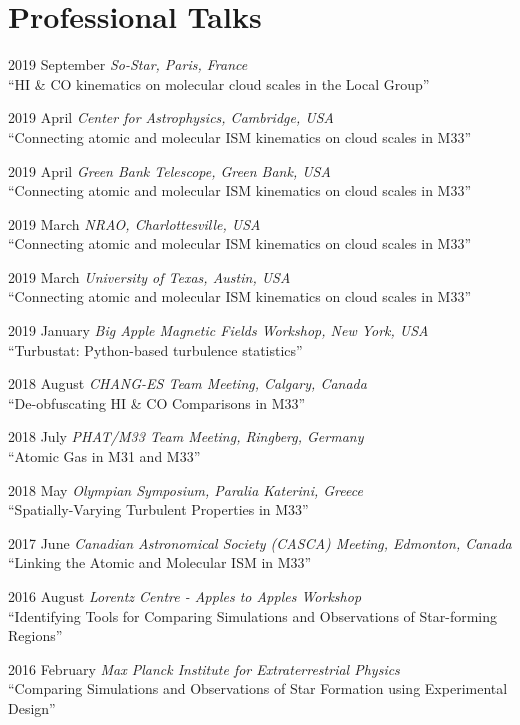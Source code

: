 \documentclass[letterpaper,11pt]{article}
\newlength{\mainindent} \setlength{\mainindent}{12pt}
\newlength{\contentindent} \setlength{\contentindent}{19ex}
\newenvironment{datelist}{
  \begingroup
  \raggedright
  \begin{description}[labelindent=\mainindent,leftmargin=\contentindent,
      style=sameline,font=\normalfont,topsep=0pt,partopsep=0pt,parsep=0pt,
      itemsep=4pt]
}{
  \end{description}
  \endgroup
}
\begin{document}
\section*{Professional Talks}
\begin{datelist}
\item[2019 September] \emph{So-Star, Paris, France} \\ ``HI \& CO kinematics on molecular cloud scales in the Local Group''
\item[2019 April] \emph{Center for Astrophysics, Cambridge, USA} \\ ``Connecting atomic and molecular ISM kinematics on cloud scales in M33''
\item[2019 April] \emph{Green Bank Telescope, Green Bank, USA} \\ ``Connecting atomic and molecular ISM kinematics on cloud scales in M33''
\item[2019 March] \emph{NRAO, Charlottesville, USA} \\ ``Connecting atomic and molecular ISM kinematics on cloud scales in M33''
\item[2019 March] \emph{University of Texas, Austin, USA} \\ ``Connecting atomic and molecular ISM kinematics on cloud scales in M33''
\item[2019 January] \emph{Big Apple Magnetic Fields Workshop, New York, USA} \\ ``Turbustat: Python-based turbulence statistics''
\item[2018 August] \emph{CHANG-ES Team Meeting, Calgary, Canada} \\ ``De-obfuscating HI \& CO Comparisons in M33''
\item[2018 July] \emph{PHAT/M33 Team Meeting, Ringberg, Germany} \\ ``Atomic Gas in M31 and M33''
\item[2018 May] \emph{Olympian Symposium, Paralia Katerini, Greece} \\ ``Spatially-Varying Turbulent Properties in M33''
\item[2017 June] \emph{Canadian Astronomical Society (CASCA) Meeting, Edmonton, Canada} \\ ``Linking the Atomic and Molecular ISM in M33''
\item[2016 August] \emph{Lorentz Centre - Apples to Apples Workshop} \\ ``Identifying Tools for Comparing Simulations and Observations of Star-forming Regions''
\item[2016 February] \emph{Max Planck Institute for Extraterrestrial Physics} \\ ``Comparing Simulations and Observations of Star Formation using Experimental Design''

\end{datelist}
\end{document}
